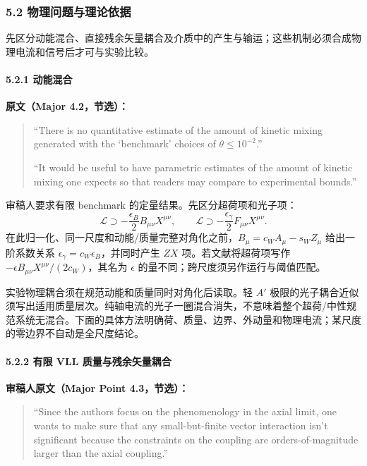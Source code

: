 \documentclass[
]{article}
\begin{document}
\subsubsection{5.2
物理问题与理论依据}\label{ux7269ux7406ux95eeux9898ux4e0eux7406ux8bbaux4f9dux636e-3}

先区分动能混合、直接残余矢量耦合及介质中的产生与输运；这些机制必须合成物理电流和信号后才可与实验比较。

\paragraph{5.2.1 动能混合}\label{ux52a8ux80fdux6df7ux5408}

\textbf{原文（Major 4.2，节选）：}

\begin{quote}
``There is no quantitative estimate of the amount of kinetic mixing
generated with the `benchmark' choices of \(\theta\leq10^{-2}\).''

``It would be useful to have parametric estimates of the amount of
kinetic mixing one expects so that readers may compare to experimental
bounds.''
\end{quote}

审稿人要求有限 benchmark 的定量结果。先区分超荷项和光子项： \[
\mathcal L\supset-\frac{\epsilon_B}{2}B_{\mu\nu}X^{\mu\nu},
\qquad \mathcal L\supset-\frac{\epsilon_\gamma}{2}F_{\mu\nu}X^{\mu\nu}.
\]
在此归一化、同一尺度和动能/质量完整对角化之前，\(B_\mu=c_WA_\mu-s_WZ_\mu\)
给出一阶系数关系 \(\epsilon_\gamma=c_W\epsilon_B\)，并同时产生 \(ZX\)
项。若文献将超荷项写作 \(-\epsilon B_{\mu\nu}X^{\mu\nu}/(2c_W)\)，其名为
\(\epsilon\) 的量不同；跨尺度须另作运行与阈值匹配。

实验物理耦合须在规范动能和质量同时对角化后读取。轻 \(A'\)
极限的光子耦合近似须写出适用质量层次。纯轴电流的光子一圈混合消失，不意味着整个超荷/中性规范系统无混合。下面的具体方法明确荷、质量、边界、外动量和物理电流；某尺度的零边界不自动是全尺度结论。

\paragraph{5.2.2 有限 VLL
质量与残余矢量耦合}\label{ux6709ux9650-vll-ux8d28ux91cfux4e0eux6b8bux4f59ux77e2ux91cfux8026ux5408}

\textbf{审稿人原文（Major Point 4.3，节选）：}

\begin{quote}
``Since the authors focus on the phenomenology in the axial limit, one
wants to make sure that any small-but-finite vector interaction isn't
significant because the constraints on the coupling are
orders-of-magnitude larger than the axial coupling.''
\end{quote}
\end{document}
